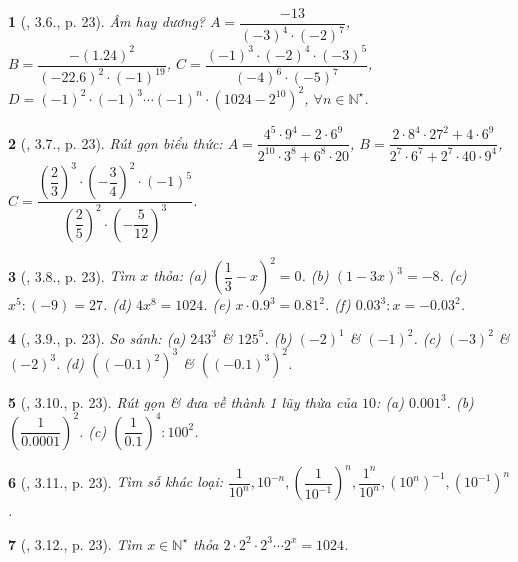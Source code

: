 \documentclass{article}
\newtheorem{baitoan}{}
\begin{document}
\begin{baitoan}[\cite{Binh_boi_duong_Toan_7_tap_1}, 3.6., p. 23]
	Âm hay dương? $A = \dfrac{-13}{(-3)^4\cdot(-2)^7}$, $B = \dfrac{-(1.24)^2}{(-22.6)^2\cdot(-1)^{19}}$, $C = \dfrac{(-1)^3\cdot(-2)^4\cdot(-3)^5}{(-4)^6\cdot(-5)^7}$, $D = (-1)^2\cdot(-1)^3\cdots(-1)^n\cdot(1024 - 2^{10})^2$, $\forall n\in\mathbb{N}^\star$.
\end{baitoan}

\begin{baitoan}[\cite{Binh_boi_duong_Toan_7_tap_1}, 3.7., p. 23]
	Rút gọn biểu thức: $A = \dfrac{4^5\cdot9^4 - 2\cdot6^9}{2^{10}\cdot3^8 + 6^8\cdot20}$, $B = \dfrac{2\cdot8^4\cdot27^2 + 4\cdot6^9}{2^7\cdot6^7 + 2^7\cdot40\cdot9^4}$, $C = \dfrac{\left(\dfrac{2}{3}\right)^3\cdot\left(-\dfrac{3}{4}\right)^2\cdot(-1)^5}{\left(\dfrac{2}{5}\right)^2\cdot\left(-\dfrac{5}{12}\right)^3}$.
\end{baitoan}

\begin{baitoan}[\cite{Binh_boi_duong_Toan_7_tap_1}, 3.8., p. 23]
	Tìm $x$ thỏa: (a) $\left(\dfrac{1}{3} - x\right)^2 = 0$. (b) $(1 - 3x)^3 = -8$. (c) $x^5:(-9) = 27$. (d) $4x^8 = 1024$. (e) $x\cdot0.9^3 = 0.81^2$. (f) $0.03^3:x = -0.03^2$.
\end{baitoan}

\begin{baitoan}[\cite{Binh_boi_duong_Toan_7_tap_1}, 3.9., p. 23]
	So sánh: (a) $243^3$ \& $125^5$. (b) $(-2)^1$ \& $(-1)^2$. (c) $(-3)^2$ \& $(-2)^3$. (d) $((-0.1)^2)^3$ \& $((-0.1)^3)^2$.
\end{baitoan}

\begin{baitoan}[\cite{Binh_boi_duong_Toan_7_tap_1}, 3.10., p. 23]
	Rút gọn \& đưa về thành 1 lũy thừa của $10$: (a) $0.001^3$. (b) $\left(\dfrac{1}{0.0001}\right)^2$. (c) $\left(\dfrac{1}{0.1}\right)^4:100^2$.
\end{baitoan}

\begin{baitoan}[\cite{Binh_boi_duong_Toan_7_tap_1}, 3.11., p. 23]
	Tìm số khác loại: $\dfrac{1}{10^n},10^{-n},\left(\dfrac{1}{10^{-1}}\right)^n,\dfrac{1^n}{10^n},(10^n)^{-1},(10^{-1})^n$.
\end{baitoan}

\begin{baitoan}[\cite{Binh_boi_duong_Toan_7_tap_1}, 3.12., p. 23]
	Tìm $x\in\mathbb{N}^\star$ thỏa $2\cdot2^2\cdot2^3\cdots2^x = 1024$.
\end{baitoan}
\end{document}
